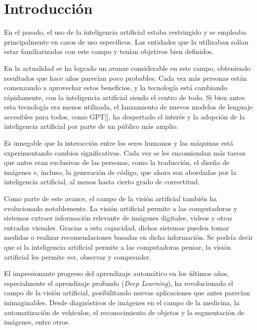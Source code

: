 \chapter*{Introducci\'on}\label{chapter:introduction}

En el pasado, el uso de la inteligencia artificial estaba restringido y se empleaba principalmente en casos de uso espec\'ificos. Las entidades que la utilizaban sol\'ian estar familiarizadas con este campo y ten\'ian objetivos bien definidos.

En la actualidad se ha logrado un avanze considerable en este campo, obteniendo resultados que hace a\~nos parec\'ian poco probables. Cada vez m\'as personas est\'an comenzando a aprovechar estos beneficios, y la tecnolog\'ia est\'a cambiando r\'apidamente, con la inteligencia artificial siendo el centro de todo. Si bien antes esta tecnolog\'ia era menos utilizada,  el lanzamiento de nuevos modelos de lenguaje accesibles para todos, como GPT[\cite{gpt2}], ha despertado el inter\'es y la adopci\'on de la inteligencia artificial por parte de un p\'ublico m\'as amplio.

Es innegable que la interacci\'on entre los seres humanos y las m\'aquinas est\'a experimentando cambios significativos. Cada vez se les encomiendan m\'as tareas que antes eran exclusivas de las personas, como la traducci\'on, el dise\~no de im\'agenes e, incluso, la generaci\'on de c\'odigo, que ahora son abordadas por la inteligencia artificial, al menos hasta cierto grado de correctitud.

Como parte de este avance, el campo de la visi\'on artificial tambi\'en ha evolucionado notablemente. La visi\'on artificial permite a las computadoras y sistemas extraer informaci\'on relevante de im\'agenes digitales, videos y otras entradas visuales. Gracias a esta capacidad, dichos sistemas pueden tomar medidas o realizar recomendaciones basadas en dicha informaci\'on. Se podr\'ia decir que si la inteligencia artificial permite a las computadoras pensar, la visi\'on artificial les permite ver, observar y comprender.

El impresionante progreso del aprendizaje autom\'atico en los \'ultimos a\~nos, especialmente el aprendizaje profundo (\textit{Deep Learning}), ha revolucionado el campo de la visi\'on artificial, posibilitando nuevas aplicaciones que antes parec\'ian inimaginables. Desde diagn\'osticos de im\'agenes en el campo de la medicina, la automatizaci\'on de veh\'iculos, el reconocimiento de objetos y la segmentaci\'on de im\'agenes, entre otros.

